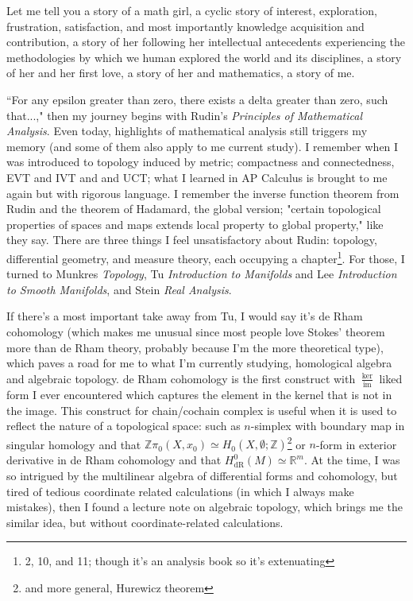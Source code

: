 \documentclass[10pt]{article}
\begin{document}
\begin{CJK*}{UTF8}{gbsn}
\noindent\makebox[\linewidth]{\rule{\paperwidth}{0.4pt}}

Let me tell you a story of a math girl, a cyclic story of interest, exploration, frustration, satisfaction, and most importantly knowledge acquisition and contribution, a story of her following her intellectual antecedents experiencing the methodologies by which we human explored the world and its disciplines, a story of her and her first love, a story of her and mathematics, a story of me.

``For any epsilon greater than zero, there exists a delta greater than zero, such that...," then my journey begins with Rudin's \textit{Principles of Mathematical Analysis}. Even today, highlights of mathematical analysis still triggers my memory (and some of them also apply to me current study). I remember when I was introduced to topology induced by metric; compactness and connectedness, EVT and IVT and and UCT; what I learned in AP Calculus is brought to me again but with rigorous language. I remember the inverse function theorem from Rudin and the theorem of Hadamard, the global version; "certain topological properties of spaces and maps extends local property to global property," like they say. There are three things I feel unsatisfactory about Rudin: topology, differential geometry, and measure theory, each occupying a chapter\footnote{2, 10, and 11; though it's an analysis book so it's extenuating}. For those, I turned to Munkres \textit{Topology}, Tu \textit{Introduction to Manifolds} and Lee \textit{Introduction to Smooth Manifolds}, and Stein \textit{Real Analysis}. 

If there's a most important take away from Tu, I would say it's de Rham cohomology (which makes me unusual since most people love Stokes' theorem more than de Rham theory, probably because I'm the more theoretical type), which paves a road for me to what I'm currently studying, homological algebra and algebraic topology. de Rham cohomology is the first construct with $\frac{\ker}{\operatorname{im}}$ liked form I ever encountered which captures the element in the kernel that is not in the image. This construct for chain/cochain complex is useful when it is used to reflect the nature of a topological space: such as $n$-simplex with boundary map in singular homology and that $\mathbb{Z}\pi_0(X,x_0)\simeq H_0(X,\emptyset;\mathbb{Z})$\footnote{and more general, Hurewicz theorem} or $n$-form in exterior derivative in de Rham cohomology and that $H^0_{\mathrm{dR}}(M)\simeq\mathbb{R}^m$. At the time, I was so intrigued by the multilinear algebra of differential forms and cohomology, but tired of tedious coordinate related calculations (in which I always make mistakes), then I found a lecture note on algebraic topology, which brings me the similar idea, but without coordinate-related calculations.


\end{CJK*}
\end{document}
